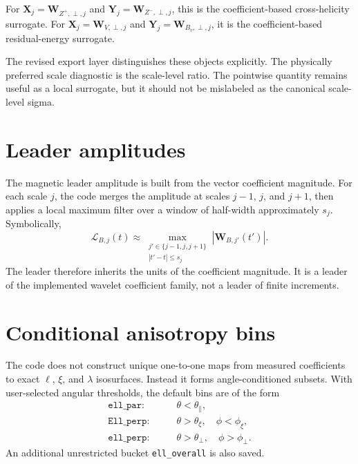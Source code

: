 \documentclass[11pt]{article}
\begin{document}
For $\mathbf{X}_j = \mathbf{W}_{Z^+,\perp,j}$ and $\mathbf{Y}_j = \mathbf{W}_{Z^-,\perp,j}$, this is the coefficient-based cross-helicity surrogate. For $\mathbf{X}_j = \mathbf{W}_{V,\perp,j}$ and $\mathbf{Y}_j = \mathbf{W}_{B_v,\perp,j}$, it is the coefficient-based residual-energy surrogate.

The revised export layer distinguishes these objects explicitly. The physically preferred scale diagnostic is the scale-level ratio. The pointwise quantity remains useful as a local surrogate, but it should not be mislabeled as the canonical scale-level sigma.

\section{Leader amplitudes}

The magnetic leader amplitude is built from the vector coefficient magnitude. For each scale $j$, the code merges the amplitude at scales $j-1$, $j$, and $j+1$, then applies a local maximum filter over a window of half-width approximately $s_j$. Symbolically,
\begin{equation}
 \mathcal{L}_{B,j}(t) \approx \max_{\substack{j' \in \{j-1,j,j+1\} \\ |t'-t| \le s_j}} |\mathbf{W}_{B,j'}(t')|.
\end{equation}
The leader therefore inherits the units of the coefficient magnitude. It is a leader of the implemented wavelet coefficient family, not a leader of finite increments.

\section{Conditional anisotropy bins}

The code does not construct unique one-to-one maps from measured coefficients to exact $\ell$, $\xi$, and $\lambda$ isosurfaces. Instead it forms angle-conditioned subsets. With user-selected angular thresholds, the default bins are of the form
\begin{align}
 \texttt{ell\_par}:& \qquad \theta < \theta_{\parallel}, \\
 \texttt{Ell\_perp}:& \qquad \theta > \theta_{\xi}, \quad \phi < \phi_{\xi}, \\
 \texttt{ell\_perp}:& \qquad \theta > \theta_{\perp}, \quad \phi > \phi_{\perp}.
\end{align}
An additional unrestricted bucket \texttt{ell\_overall} is also saved.
\end{document}
